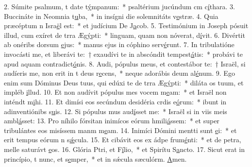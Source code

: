 2. Súmite psalmum, t date t\uline{ý}mpanum:~* psaltérium jucúndum cm c\uline{í}thara.
3. Buccináte in Neomnia t\uline{u}ba,~* in insígni die solemnitáts v\uline{e}stræ.
4. Quia præcéptum n Isra\uline{ë}l est:~* et judícium De J\uline{a}cob.
5. Testimónium in Joseph pósuit illud, cum exíret de trra Æg\uline{ý}pti:~* linguam, quam non nóverat, d\uline{í}vit.
6. Divértit ab onéribs dorsum \uline{e}jus:~* manus ejus in cóphino serv\uline{é}runt.
7. In tribulatióne invocásti me, et liberávi te:~† exaudívi te in abscóndit tempest\uline{á}tis:~* probávi te apud aquam contradict\uline{ó}nis.
8. Audi, pópulus meus, et contestábor te:~† Israël, si audíeris me, non erit in t deus r\uline{e}cens,~* neque adorábis deum al\uline{é}num.
9. Ego enim sum Dóminus Deus tuus, qui edúxi te de trra Æg\uline{ý}pti:~* diláta os tuum, et impléb \uline{i}llud.
10. Et non audívit pópulus mes vocem m\uline{e}am:~* et Israël non inténdt m\uline{i}hi.
11. Et dimísi eos secúndum desidéria crdis e\uline{ó}rum:~* ibunt in adinventiónibs s\uline{u}is.
12. Si pópulus mus aud\uline{í}sset me:~* Israël si in viis meis ambl\uline{á}sset:
13. Pro níhilo fórsitan inimícos eórum hmili\uline{á}ssem:~* et super tribulántes eos misíssem manm m\uline{e}am.
14. Inimíci Dómini mentti sunt \uline{e}i:~* et erit tempus eórum n s\uline{ǽ}cula.
15. Et cibávit eos ex ádpe frum\uline{é}nti:~* et de petra, melle saturávt \uline{e}os.
16. Glória Ptri, et F\uline{í}lio,~* et Spirítu S\uline{a}ncto.
17. Sicut erat in princípio, t nunc, et s\uline{e}mper,~* et in sǽcula sæculórm. \uline{A}men.
